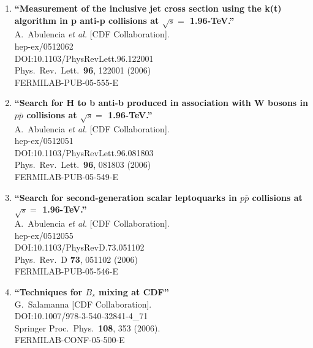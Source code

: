 \documentclass{article}
\begin{document}
\begin{enumerate}
\item%
{\bf ``Measurement of the inclusive jet cross section using the k(t) algorithm in p anti-p collisions at $\sqrt{s}=$ 1.96-TeV.''}
  \\{}A.~Abulencia {\it et al.} [CDF Collaboration].
  \\{}hep-ex/0512062
  \\{}DOI:10.1103/PhysRevLett.96.122001
  \\{}Phys.\ Rev.\ Lett.\  {\bf 96}, 122001 (2006)
  \\{}FERMILAB-PUB-05-555-E
\item%
{\bf ``Search for H to b anti-b produced in association with W bosons in $p\bar{p}$ collisions at $\sqrt{s} =$ 1.96-TeV.''}
  \\{}A.~Abulencia {\it et al.} [CDF Collaboration].
  \\{}hep-ex/0512051
  \\{}DOI:10.1103/PhysRevLett.96.081803
  \\{}Phys.\ Rev.\ Lett.\  {\bf 96}, 081803 (2006)
  \\{}FERMILAB-PUB-05-549-E
\item%
{\bf ``Search for second-generation scalar leptoquarks in $p\bar{p}$ collisions at $\sqrt{s} =$ 1.96-TeV.''}
  \\{}A.~Abulencia {\it et al.} [CDF Collaboration].
  \\{}hep-ex/0512055
  \\{}DOI:10.1103/PhysRevD.73.051102
  \\{}Phys.\ Rev.\ D {\bf 73}, 051102 (2006)
  \\{}FERMILAB-PUB-05-546-E
\item%
{\bf ``Techniques for $B_s$ mixing at CDF''}
  \\{}G.~Salamanna [CDF Collaboration].
  \\{}DOI:10.1007/978-3-540-32841-4\_71
  \\{}Springer Proc.\ Phys.\  {\bf 108}, 353 (2006).
  \\{}FERMILAB-CONF-05-500-E


\end{enumerate}
\end{document}
